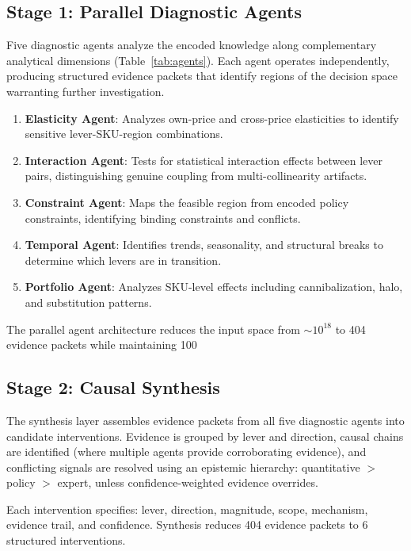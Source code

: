 \documentclass[11pt,a4paper]{article}
\begin{document}
\subsection{Stage 1: Parallel Diagnostic Agents}

Five diagnostic agents analyze the encoded knowledge along complementary analytical dimensions (Table~\ref{tab:agents}).
Each agent operates independently, producing structured evidence packets that identify regions of the decision space warranting further investigation.

\begin{enumerate}
    \item \textbf{Elasticity Agent}: Analyzes own-price and cross-price elasticities to identify sensitive lever-SKU-region combinations.
    \item \textbf{Interaction Agent}: Tests for statistical interaction effects between lever pairs, distinguishing genuine coupling from multi-collinearity artifacts.
    \item \textbf{Constraint Agent}: Maps the feasible region from encoded policy constraints, identifying binding constraints and conflicts.
    \item \textbf{Temporal Agent}: Identifies trends, seasonality, and structural breaks to determine which levers are in transition.
    \item \textbf{Portfolio Agent}: Analyzes SKU-level effects including cannibalization, halo, and substitution patterns.
\end{enumerate}

The parallel agent architecture reduces the input space from $\sim 10^{18}$ to 404 evidence packets while maintaining 100%



\subsection{Stage 2: Causal Synthesis}

The synthesis layer assembles evidence packets from all five diagnostic agents into candidate interventions.
Evidence is grouped by lever and direction, causal chains are identified (where multiple agents provide corroborating evidence), and conflicting signals are resolved using an epistemic hierarchy: quantitative $>$ policy $>$ expert, unless confidence-weighted evidence overrides.

Each intervention specifies: lever, direction, magnitude, scope, mechanism, evidence trail, and confidence.
Synthesis reduces 404 evidence packets to 6 structured interventions.
\end{document}
